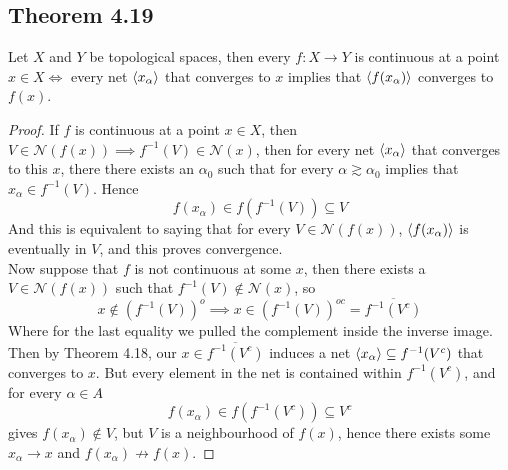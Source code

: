 \documentclass[../../main.tex]{subfiles}
\begin{document}
\subsection{Theorem 4.19}
\begin{wts}
Let $X$ and $Y$ be topological spaces, then every $f:X\to Y$ is continuous at a point $x\in X\iff$ every net $\langle {x_\alpha} \rangle$ that converges to $x$ implies that $\langle {f(x_\alpha)} \rangle$ converges to $f(x)$.
\end{wts}
\newcommand{\n}[1]{\mathcal{N}({#1})}
\begin{proof}
If $f$ is continuous at a point $x\in X$, then $V\in\n{f(x)}\implies f^{-1}(V)\in\n{x}$, then for every net $\langle {x_\alpha} \rangle$ that converges to this $x$, there there exists an $\alpha_0$ such that for every $\alpha\gtrsim\alpha_0$ implies that $x_\alpha\in f^{-1}(V)$. Hence 
\[
f(x_\alpha)\in f\left(f^{-1}(V)\right)\subseteq V
\]
And this is equivalent to saying that for every $V\in\n{f(x)}$, $\langle {f(x_\alpha)} \rangle$ is eventually in $V$, and this proves convergence.\\

Now suppose that $f$ is not continuous at some $x$, then there exists a $V\in\n{f(x)}$ such that $f^{-1}(V)\notin\n{x}$, so 
\[
x\notin \left(f^{-1}(V)\right)^o\implies x\in \left(f^{-1}(V)\right)^{oc}=\overline{f^{-1}(V^c)}
\]
Where for the last equality we pulled the complement inside the inverse image. Then by Theorem 4.18, our $x\in\overline{f^{-1}(V^c)}$ induces a net $\langle {x_\alpha} \rangle\subseteq f^{-1}(V^c)$ that converges to $x$. But every element in the net is contained within $f^{-1}(V^c)$, and for every $\alpha\in A$
\[
f(x_\alpha)\in f\left(f^{-1}(V^c)\right)\subseteq V^c
\]
gives $f(x_\alpha)\notin V$, but $V$ is a neighbourhood of $f(x)$, hence there exists some $x_\alpha\to x$ and $f(x_\alpha)\not\to f(x)$.
\end{proof}
\end{document}
